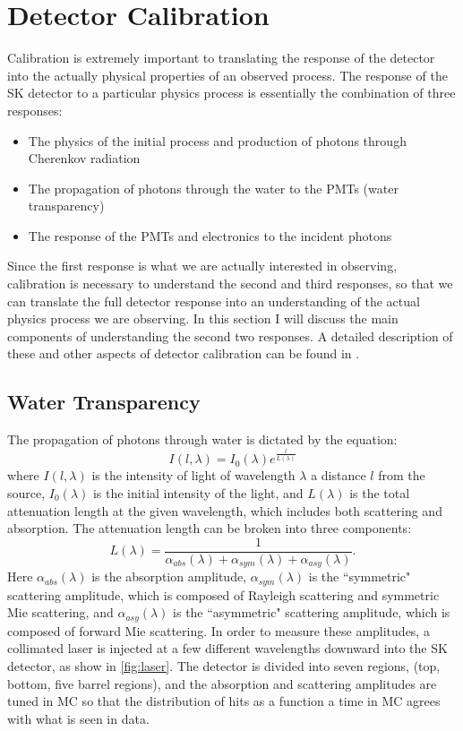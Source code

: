 \section{Detector Calibration}
\label{sec:calibration}
Calibration is extremely important to translating the response of the detector into the actually physical properties of an observed process.  The response of the SK detector to a particular physics process is essentially the combination of three responses:
\begin{itemize}
\item The physics of the initial process and production of photons through Cherenkov radiation
\item The propagation of photons through the water to the PMTs (water transparency)
\item  The response of the PMTs and electronics to the incident photons
\end{itemize}
Since the first response is what we are actually interested in observing, calibration is necessary to understand the second and third responses, so that we can translate the full detector response into an understanding of the actual physics process we are observing.  In this section I will discuss the main components of understanding the second two responses.  A detailed description of these and other aspects of detector calibration can be found in \cite{Abe:2013gga}.

\subsection{Water Transparency}
The propagation of photons through water is dictated by the equation:
\begin{equation}
I(l,\lambda)=I_0(\lambda)e^{\frac{l}{L(\lambda)}}
\label{eq:light_intensity}
\end{equation} 
 where $I(l,\lambda)$ is the intensity of light of wavelength $\lambda$ a distance $l$ from the source, $I_0(\lambda)$ is the initial intensity of the light, and $L(\lambda)$ is the total attenuation length at the given wavelength, which includes both scattering and absorption.  The attenuation length can be broken into three components:
\begin{equation}
L(\lambda)=\frac{1}{\alpha_{abs}(\lambda)+\alpha_{sym}(\lambda)+\alpha_{asy}(\lambda)}.
\end{equation}
Here $\alpha_{abs}(\lambda)$ is the absorption amplitude, $\alpha_{sym}(\lambda)$ is the ``symmetric" scattering amplitude, which is composed of Rayleigh scattering and symmetric Mie scattering, and $\alpha_{asy}(\lambda)$ is the ``asymmetric" scattering amplitude, which is composed of forward Mie scattering.  In order to measure these amplitudes, a collimated laser is injected at a few different wavelengths downward into the SK detector, as show in \cref{fig:laser}.  The detector is divided into seven regions, (top, bottom, five barrel regions), and the absorption and scattering amplitudes are tuned in MC so that the distribution of hits as a function a time in MC agrees with what is seen in data.  

